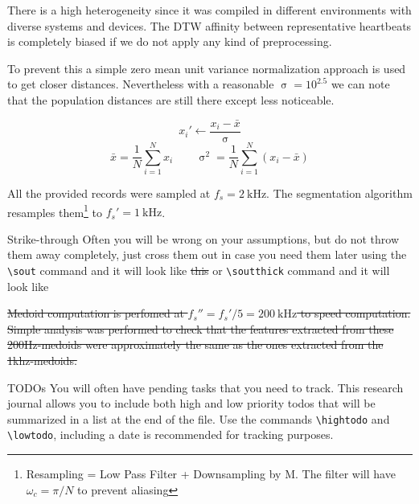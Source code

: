 \documentclass{project-logbook}
\begin{document}
{There is a high heterogeneity since it was compiled in different environments with diverse systems and devices. The DTW affinity between representative heartbeats is completely biased if we do not apply any kind of preprocessing.

To prevent this a simple zero mean unit variance normalization approach is used to get closer distances. Nevertheless with a reasonable $\upsigma  = 10^{2.5}$ we can note that the population distances are still there except less noticeable.

\begin{equation}
    x_i' \gets \frac{x_i-\bar{x}}{\upsigma}
\end{equation}
\begin{equation}
    \bar{x} = \frac{1}{N}\sum_{i=1}^{N} x_i \qquad \upsigma^2 = {\frac{1}{N}\sum_{i=1}^{N} (x_i-\bar{x})}
\end{equation}

All the provided records were sampled at $f_s = \SI{2}{\kilo\Hz}$. The segmentation algorithm resamples them\footnote{Resampling = Low Pass Filter + Downsampling by M. The filter will have $\omega_c = \pi/N$ to prevent aliasing} to $ f_s' = \SI{1}{\kilo\Hz}$.
\begin{tipt}{Strike-through}
 Often you will be wrong on your assumptions, but do not throw them away completely, just cross them out in case you need them later using the \texttt{\textbackslash sout} command and it will look like \sout{this} or \texttt{\textbackslash soutthick} command and it will look like 
\end{tipt}

\sout{Medoid computation is perfomed at $f_s'' = f_s'/5 = \SI{200}{\kilo\hertz}$ to speed computation. Simple analysis was performed to check that the features extracted from these 200Hz-medoids were approximately the same as the ones extracted from the  1khz-medoids.}


\begin{tipt}{TODOs}
You will often have pending tasks that you need to track. This research journal allows you to include both high and low priority todos that will be summarized in a list at the end of the file. Use the commands \texttt{\textbackslash hightodo} and \texttt{\textbackslash lowtodo}, including a date is recommended for tracking purposes.


\end{tipt}}
\end{document}
